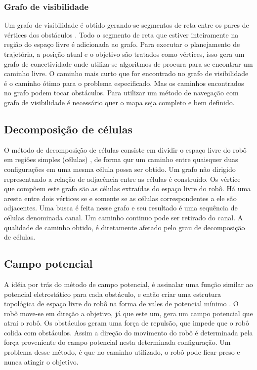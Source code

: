 \documentclass[12pt]{article}
\begin{document}
\subsubsection{Grafo de visibilidade}
  Um grafo de visibilidade é obtido gerando-se segmentos de
reta entre os pares de vértices dos obstáculos \cite{tecnicasNavegacao}. Todo o
segmento de reta que estiver inteiramente na região do espaço
livre é adicionada ao grafo. Para executar o
planejamento de trajetória, a posição atual e o objetivo são
tratados como vértices, isso gera um grafo de conectividade
onde utiliza-se algoritmos de procura para se encontrar um
caminho livre. O caminho mais curto que for encontrado no grafo de
visibilidade é o caminho ótimo para o problema especificado\cite{tecnicasNavegacao}.
Mas os caminhos encontrados no grafo podem tocar obstáculos.
Para utilizar um método de navegação com grafo de visibilidade é
necessário quer o mapa seja completo e bem definido.

\subsection{Decomposição de células}
  O método de decomposição de células consiste em dividir o espaço livre do robô em regiôes simples (células) \cite{planejamentoTrajetorias},
  de forma qur um caminho entre quaisquer duas configurações em uma mesma célula possa ser obtido. Um grafo
   não dirigido representando a relação de adjacência entre as células é construído. Os vértice que compôem este grafo são as células extraídas do espaço livre do robô. Há uma 
   aresta entre dois vértices se e somente se as células correspondentes a ele são adjacentes. Uma busca é feita nesse grafo 
   e seu resultado é uma sequência de células denominada canal. Um caminho continuo pode ser retirado do canal. A qualidade de caminho obtido, 
   é diretamente afetado pelo grau de decomposição de células.
  
\subsection{Campo potencial}
   A idéia por trás do método de campo potencial, é assinalar uma função similar ao potencial eletrostático
   para cada obstáculo, e então criar uma estrutura topológica de espaço livre do robô na forma de vales de potencial 
   mínimo \cite{voronoi}. O robô move-se em direção a objetivo, já que este um, gera um campo potencial que atrai o robô. Os obstáculos geram
    uma força de repulsão, que impede que o robô colida com obstáculos. Assim a direção do movimento do 
    robô é determinada pela força proveniente do campo potencial nesta determinada configuração. Um problema desse método, é que no caminho utilizado, o robô 
    pode ficar preso e nunca atingir o objetivo.
\end{document}
